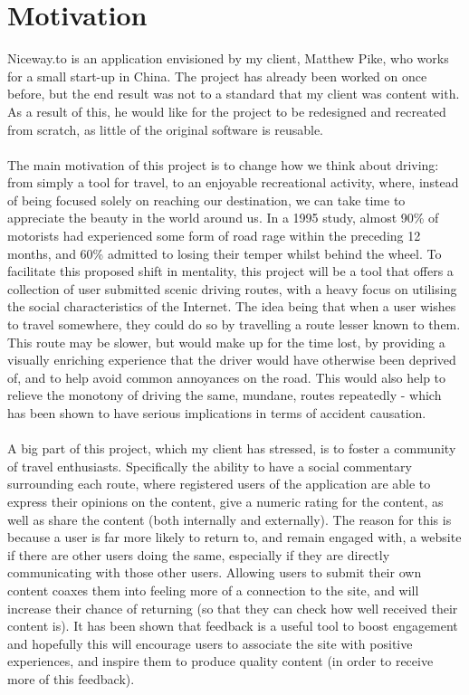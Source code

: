 \section{Motivation}
Niceway.to is an application envisioned by my client, Matthew Pike, who works for a small start-up in China. The project has already been worked on once before, but the end result was not to a standard that my client was content with. As a result of this, he would like for the project to be redesigned and recreated from scratch, as little of the original software is reusable.\ \\
\ \\
The main motivation of this project is to change how we think about driving: from simply a tool for travel, to an enjoyable recreational activity, where, instead of being focused solely on reaching our destination, we can take time to appreciate the beauty in the world around us. In a 1995 study, almost 90\% of motorists had experienced some form of road rage within the preceding 12 months, and 60\% admitted to losing their temper whilst behind the wheel\cite{joint1995road}. To facilitate this proposed shift in mentality, this project will be a tool that offers a collection of user submitted scenic driving routes, with a heavy focus on utilising the social characteristics of the Internet. The idea being that when a user wishes to travel somewhere, they could do so by travelling a route lesser known to them. This route may be slower, but would make up for the time lost, by providing a visually enriching experience that the driver would have otherwise been deprived of, and to help avoid common annoyances on the road. This would also help to relieve the monotony of driving the same, mundane, routes repeatedly - which has been shown to have serious implications in terms of accident causation\cite{thiffault2003monotony}. \ \\
\ \\
A big part of this project, which my client has stressed, is to foster a community of travel enthusiasts. Specifically the ability to have a social commentary surrounding each route, where registered users of the application are able to express their opinions on the content, give a numeric rating for the content, as well as share the content (both internally and externally). The reason for this is because a user is far more likely to return to, and remain engaged with, a website if there are other users doing the same, especially if they are directly communicating with those other users\cite{ling2005using}. Allowing users to submit their own content coaxes them into feeling more of a connection to the site, and will increase their chance of returning (so that they can check how well received their content is). It has been shown that feedback is a useful tool to boost engagement\cite{o2008user} and hopefully this will encourage users to associate the site with positive experiences, and inspire them to produce quality content (in order to receive more of this feedback).\ \\
